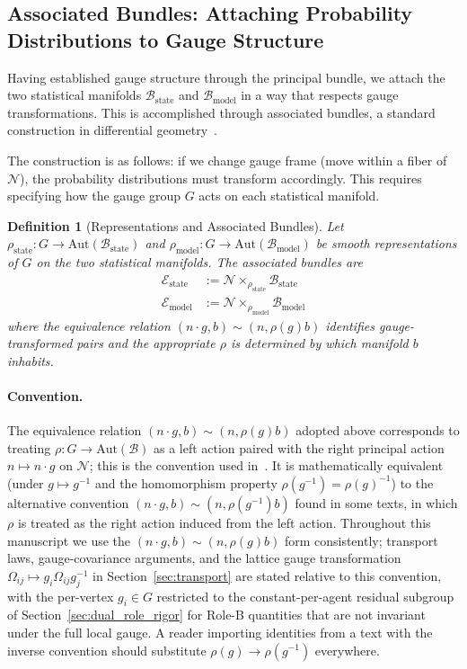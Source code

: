 \documentclass[11pt]{article}
\newtheorem{definition}{Definition}
\begin{document}
\subsection{Associated Bundles: Attaching Probability Distributions to Gauge Structure}

Having established gauge structure through the principal bundle, we attach the two statistical manifolds $\mathcal{B}_{\mathrm{state}}$ and $\mathcal{B}_{\mathrm{model}}$ in a way that respects gauge transformations. This is accomplished through associated bundles, a standard construction in differential geometry~\cite{nakahara2003geometry, frankel2011geometry}.

The construction is as follows: if we change gauge frame (move within a fiber of $\mathcal{N}$), the probability distributions must transform accordingly. This requires specifying how the gauge group $G$ acts on each statistical manifold.

\begin{definition}[Representations and Associated Bundles]
Let $\rho_{\mathrm{state}}: G \to \mathrm{Aut}(\mathcal{B}_{\mathrm{state}})$ and $\rho_{\mathrm{model}}: G \to \mathrm{Aut}(\mathcal{B}_{\mathrm{model}})$ be smooth representations of $G$ on the two statistical manifolds. The associated bundles are
\begin{align}
\mathcal{E}_{\mathrm{state}} &:= \mathcal{N} \times_{\rho_{\mathrm{state}}} \mathcal{B}_{\mathrm{state}} \\
\mathcal{E}_{\mathrm{model}} &:= \mathcal{N} \times_{\rho_{\mathrm{model}}} \mathcal{B}_{\mathrm{model}}
\end{align}
where the equivalence relation $(n \cdot g, b) \sim (n, \rho(g)b)$ identifies gauge-transformed pairs and the appropriate $\rho$ is determined by which manifold $b$ inhabits.
\end{definition}

\paragraph{Convention.} The equivalence relation $(n\cdot g, b) \sim (n, \rho(g)b)$ adopted above corresponds to treating $\rho: G \to \mathrm{Aut}(\mathcal{B})$ as a left action paired with the right principal action $n \mapsto n\cdot g$ on $\mathcal{N}$; this is the convention used in~\cite{nakahara2003geometry}. It is mathematically equivalent (under $g \mapsto g^{-1}$ and the homomorphism property $\rho(g^{-1}) = \rho(g)^{-1}$) to the alternative convention $(n\cdot g, b) \sim (n, \rho(g^{-1})b)$ found in some texts, in which $\rho$ is treated as the right action induced from the left action. Throughout this manuscript we use the $(n\cdot g, b) \sim (n, \rho(g)b)$ form consistently; transport laws, gauge-covariance arguments, and the lattice gauge transformation $\Omega_{ij} \mapsto g_i \Omega_{ij} g_j^{-1}$ in Section~\ref{sec:transport} are stated relative to this convention, with the per-vertex $g_i \in G$ restricted to the constant-per-agent residual subgroup of Section~\ref{sec:dual_role_rigor} for Role-B quantities that are not invariant under the full local gauge. A reader importing identities from a text with the inverse convention should substitute $\rho(g) \to \rho(g^{-1})$ everywhere.
\end{document}
